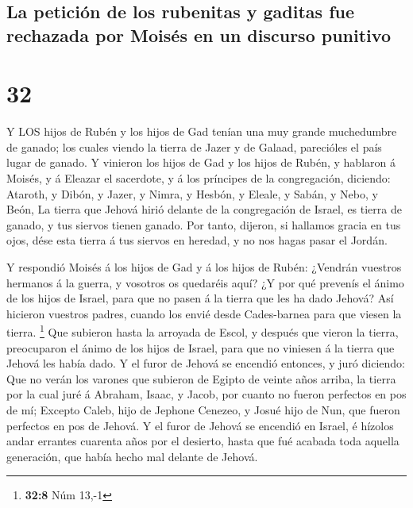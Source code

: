 \hypertarget{la-peticiuxf3n-de-los-rubenitas-y-gaditas-fue-rechazada-por-moisuxe9s-en-un-discurso-punitivo}{%
\subsection{La petición de los rubenitas y gaditas fue rechazada por
Moisés en un discurso
punitivo}\label{la-peticiuxf3n-de-los-rubenitas-y-gaditas-fue-rechazada-por-moisuxe9s-en-un-discurso-punitivo}}

\hypertarget{section-31}{%
\section{32}\label{section-31}}

 Y LOS hijos de Rubén y los hijos de Gad tenían una muy
grande muchedumbre de ganado; los cuales viendo la tierra de Jazer y de
Galaad, parecióles el país lugar de ganado.  Y vinieron los
hijos de Gad y los hijos de Rubén, y hablaron á Moisés, y á Eleazar el
sacerdote, y á los príncipes de la congregación, diciendo: 
Ataroth, y Dibón, y Jazer, y Nimra, y Hesbón, y Eleale, y Sabán, y Nebo,
y Beón,  La tierra que Jehová hirió delante de la
congregación de Israel, es tierra de ganado, y tus siervos tienen
ganado.  Por tanto, dijeron, si hallamos gracia en tus ojos,
dése esta tierra á tus siervos en heredad, y no nos hagas pasar el
Jordán.

 Y respondió Moisés á los hijos de Gad y á los hijos de
Rubén: ¿Vendrán vuestros hermanos á la guerra, y vosotros os quedaréis
aquí?  ¿Y por qué prevenís el ánimo de los hijos de Israel,
para que no pasen á la tierra que les ha dado Jehová?  Así
hicieron vuestros padres, cuando los envié desde Cades-barnea para que
viesen la tierra. \footnote{\textbf{32:8} Núm 13,-1}  Que
subieron hasta la arroyada de Escol, y después que vieron la tierra,
preocuparon el ánimo de los hijos de Israel, para que no viniesen á la
tierra que Jehová les había dado.  Y el furor de Jehová se
encendió entonces, y juró diciendo:  Que no verán los
varones que subieron de Egipto de veinte años arriba, la tierra por la
cual juré á Abraham, Isaac, y Jacob, por cuanto no fueron perfectos en
pos de mí;  Excepto Caleb, hijo de Jephone Cenezeo, y Josué
hijo de Nun, que fueron perfectos en pos de Jehová.  Y el
furor de Jehová se encendió en Israel, é hízolos andar errantes cuarenta
años por el desierto, hasta que fué acabada toda aquella generación, que
había hecho mal delante de Jehová.

